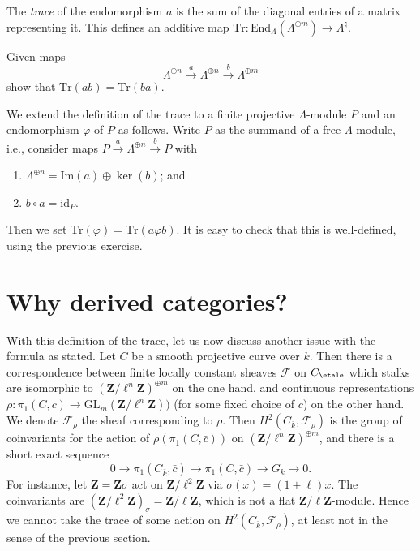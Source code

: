 \begin{definition}
\label{definition-trace}
The {\it trace} of the endomorphism $a$ is the sum of the diagonal entries of
a matrix representing it. This defines an additive map $\text{Tr} :
\text{End}_\Lambda(\Lambda^{\oplus m}) \to \Lambda^\natural$.
\end{definition}

\begin{exercise}
\label{exercise-trace-is-trace}
Given maps
$$
\Lambda^{\oplus n} \xrightarrow{a}
\Lambda^{\oplus n} \xrightarrow{b}
\Lambda^{\oplus m}
$$
show that $\text{Tr}(ab) = \text{Tr}(ba)$.
\end{exercise}

\noindent
We extend the definition of the trace to a finite projective $\Lambda$-module
$P$ and an endomorphism $\varphi$ of $P$ as follows. Write $P$ as the summand
of a free $\Lambda$-module, i.e., consider maps $P \xrightarrow{a}
\Lambda^{\oplus n} \xrightarrow{b} P$ with
\begin{enumerate}
\item
$\Lambda^{\oplus n} = \text{Im}(a) \oplus \ker(b)$; and
\item
$b\circ a = \text{id}_P$.
\end{enumerate}
Then we set $\text{Tr}(\varphi) = \text{Tr}(a\varphi b)$. It is easy to check
that this is well-defined, using the previous exercise.








\section{Why derived categories?}
\label{section-derived-categories-why}

\noindent
With this definition of the trace, let us now discuss another issue with the
formula as stated. Let $C$ be a smooth projective curve over $k$. Then there is
a correspondence between finite locally constant sheaves $\mathcal{F}$ on
$C_\etale$ which stalks are isomorphic to
${(\mathbf{Z}/\ell^n\mathbf{Z})}^{\oplus m}$ on the one hand, and continuous
representations $\rho : \pi_1 (C, \bar c) \to
\text{GL}_m(\mathbf{Z}/\ell^n\mathbf{Z}))$ (for some fixed choice of $\bar c$)
on the other hand. We denote $\mathcal{F}_\rho$ the sheaf corresponding to
$\rho$. Then $H^2 (C_{\bar k}, \mathcal{F}_\rho)$ is the group of coinvariants
for the action of $\rho(\pi_1 (C, \bar c))$ on
${(\mathbf{Z}/\ell^n\mathbf{Z})}^{\oplus m}$, and there is a short exact
sequence
$$
0 \longrightarrow \pi_1 (C_{\bar k}, \bar c) \longrightarrow \pi_1 (C, \bar c)
\longrightarrow G_k \longrightarrow 0.
$$
For instance, let $\mathbf{Z} = \mathbf{Z} \sigma$ act on
$\mathbf{Z}/\ell^2\mathbf{Z}$ via $\sigma(x) = (1+\ell) x$. The coinvariants
are $(\mathbf{Z}/\ell^2\mathbf{Z})_{\sigma} = \mathbf{Z}/\ell\mathbf{Z}$, which
is not a flat $\mathbf{Z}/\ell\mathbf{Z}$-module. Hence we cannot take the
trace of some action on $H^2(C_{\bar k}, \mathcal{F}_\rho)$, at least not in
the sense of the previous section.

